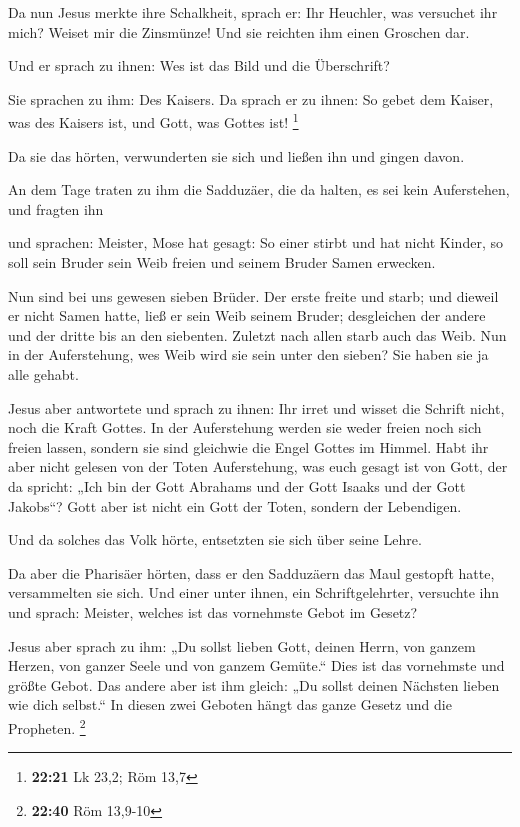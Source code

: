  Da nun Jesus merkte ihre Schalkheit, sprach er: Ihr
Heuchler, was versuchet ihr mich?  Weiset mir die
Zinsmünze! Und sie reichten ihm einen Groschen dar.

 Und er sprach zu ihnen: Wes ist das Bild und die
Überschrift?

 Sie sprachen zu ihm: Des Kaisers. Da sprach er zu ihnen:
So gebet dem Kaiser, was des Kaisers ist, und Gott, was Gottes ist!
\footnote{\textbf{22:21} Lk 23,2; Röm 13,7}

 Da sie das hörten, verwunderten sie sich und ließen ihn
und gingen davon.

 An dem Tage traten zu ihm die Sadduzäer, die da halten,
es sei kein Auferstehen, und fragten ihn

 und sprachen: Meister, Mose hat gesagt: So einer stirbt
und hat nicht Kinder, so soll sein Bruder sein Weib freien und seinem
Bruder Samen erwecken.

 Nun sind bei uns gewesen sieben Brüder. Der erste freite
und starb; und dieweil er nicht Samen hatte, ließ er sein Weib seinem
Bruder;  desgleichen der andere und der dritte bis an den
siebenten.  Zuletzt nach allen starb auch das Weib.
 Nun in der Auferstehung, wes Weib wird sie sein unter
den sieben? Sie haben sie ja alle gehabt.

 Jesus aber antwortete und sprach zu ihnen: Ihr irret und
wisset die Schrift nicht, noch die Kraft Gottes.  In der
Auferstehung werden sie weder freien noch sich freien lassen, sondern
sie sind gleichwie die Engel Gottes im Himmel.  Habt ihr
aber nicht gelesen von der Toten Auferstehung, was euch gesagt ist von
Gott, der da spricht:  „Ich bin der Gott Abrahams und der
Gott Isaaks und der Gott Jakobs``? Gott aber ist nicht ein Gott der
Toten, sondern der Lebendigen.

 Und da solches das Volk hörte, entsetzten sie sich über
seine Lehre.

 Da aber die Pharisäer hörten, dass er den Sadduzäern das
Maul gestopft hatte, versammelten sie sich.  Und einer
unter ihnen, ein Schriftgelehrter, versuchte ihn und sprach:
 Meister, welches ist das vornehmste Gebot im Gesetz?

 Jesus aber sprach zu ihm: „Du sollst lieben Gott, deinen
Herrn, von ganzem Herzen, von ganzer Seele und von ganzem Gemüte.``
 Dies ist das vornehmste und größte Gebot.
 Das andere aber ist ihm gleich: „Du sollst deinen
Nächsten lieben wie dich selbst.``  In diesen zwei
Geboten hängt das ganze Gesetz und die Propheten. \footnote{\textbf{22:40}
  Röm 13,9-10}


